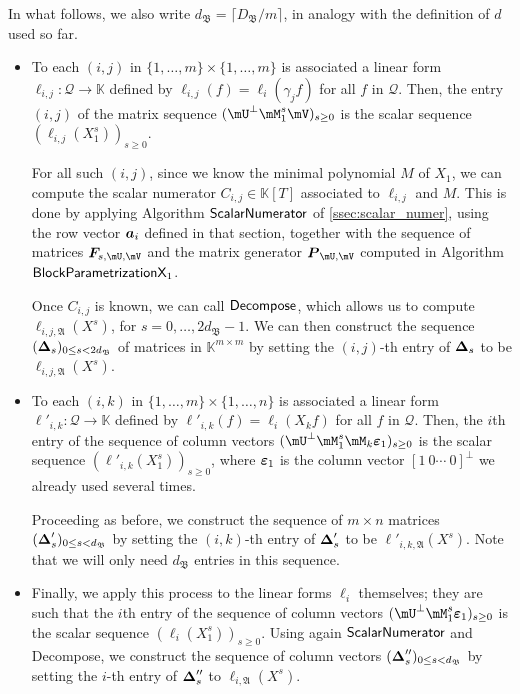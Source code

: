 \documentclass[12pt]{article}
\newcommand{\mat}[1]{\bm{\MakeUppercase{#1}}} %
\newcommand{\row}[1]{\bm{\MakeLowercase{#1}}} %
\newcommand{\col}[1]{\bm{\MakeLowercase{#1}}} %
\newcommand{\seqelt}[1]{\bm{F}_{#1}} %
\newcommand{\mainalgoname}{\mathsf{ BlockParametrization}}
\newcommand{\lf}{X}
\newcommand{\residueI}{\mathscr{Q}}
\def\K{\mathbb{K}}
\def\K {\ensuremath{\mathbb{K}}}
\begin{document}
In what follows, we also write $d_\mathfrak{B}=\lceil D_\mathfrak{B}/m \rceil$,
in analogy with the definition of $d$ used so far.
\begin{itemize}
\item To each $(i,j)$ in $\{1,\dots,m\}\times \{1,\dots,m\}$ is
  associated a linear form $\ell_{i,j}: \residueI\to \K$ defined by
  $\ell_{i,j}(f) =\ell_i(\gamma_j f)$ for all $f$ in $\residueI$.
  Then, the entry $(i,j)$ of the matrix sequence $(\mU^\perp \mM_1^s
  \mV)_{s \ge0}$ is the scalar sequence $(\ell_{i,j}(X_1^s))_{s \ge
    0}$.

\smallskip

  For all such $(i,j)$, since we know the minimal polynomial $M$ of
  $X_1$, we can compute the scalar numerator $C_{i,j} \in \K[T]$
  associated to $\ell_{i,j}$ and $M$. This is done by applying
  Algorithm $\mathsf{{\sf ScalarNumerator}}$ of
  \cref{ssec:scalar_numer}, using the row vector $\row{a}_i$ defined
  in that section, together with the sequence of matrices
  $\seqelt{s,\mU,\mV}$ and the matrix generator $\mat{P}_{\mU,\mV}$
computed in Algorithm $\mainalgoname{\sf X}_1$.

\smallskip

Once $C_{i,j}$ is known, we can call ${\sf Decompose}$, which allows us
to compute $\ell_{i,j,\mathfrak{A}}(\lf^s)$, for
$s=0,\dots,2d_\mathfrak{B}-1$.  We can then construct the sequence
$(\mat{\Delta}_s)_{0 \le s < 2d_\mathfrak{B}}$ of matrices in
$\K^{m\times m}$ by setting the $(i,j)$-th entry of $\mat{\Delta}_s$
to be $\ell_{i,j,\mathfrak{A}}(\lf^s)$.

\smallskip

\item To each $(i,k)$ in $\{1,\dots,m\}\times \{1,\dots,n\}$ is
  associated a linear form $\ell'_{i,k}: \residueI\to \K$ defined by
  $\ell'_{i,k}(f) =\ell_i(X_k f)$ for all $f$ in $\residueI$.  Then,
  the $i$th entry of the sequence of column vectors $(\mU^\perp
  \mM_1^s \mM_k \col{\varepsilon}_1)_{s \ge0}$ is the scalar sequence
  $(\ell'_{i,k}(X_1^s))_{s \ge 0}$, where $\col{\varepsilon}_1$ is the
  column vector $[1~0\cdots~0]^\perp$ we already used several times.

\smallskip

  Proceeding as before, we construct the sequence of $m \times n$ matrices
  $(\mat{\Delta}'_s)_{0 \le s < d_\mathfrak{B}}$ by setting the
  $(i,k)$-th entry of $\mat{\Delta}'_s$ to be
  $\ell'_{i,k,\mathfrak{A}}(\lf^s)$. Note that we will only need $d_\mathfrak{B}$
  entries in this sequence.

\smallskip

\item Finally, we apply this process to the linear forms $\ell_i$
  themselves; they are such that the $i$th entry of the sequence of
  column vectors $(\mU^\perp \mM_1^s \col{\varepsilon}_1)_{s \ge0}$ is
  the scalar sequence $(\ell_{i}(X_1^s))_{s \ge 0}$. Using again
  $\mathsf{{\sf ScalarNumerator}}$ and {\sf Decompose}, we construct
  the sequence of column vectors $(\mat{\Delta}''_s)_{0 \le s <
    d_\mathfrak{B}}$ by setting the $i$-th entry of $\mat{\Delta}''_s$
  to $\ell_{i,\mathfrak{A}}(\lf^s)$.
\end{itemize}
\end{document}
